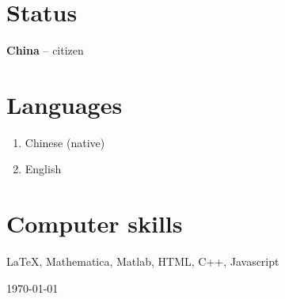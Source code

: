 \documentclass[margin]{res}
\begin{document}
\begin{resume}
\section{Status}
\textbf{China} -- citizen

\section{Languages}
\begin{enumerate}[--]
\item Chinese (native)
\item English 
\end{enumerate}

\section{Computer skills}
\LaTeX, Mathematica, Matlab, HTML, C++, Javascript
\end{resume}
\begin{flushright}
    \today
\end{flushright}
\end{document}
